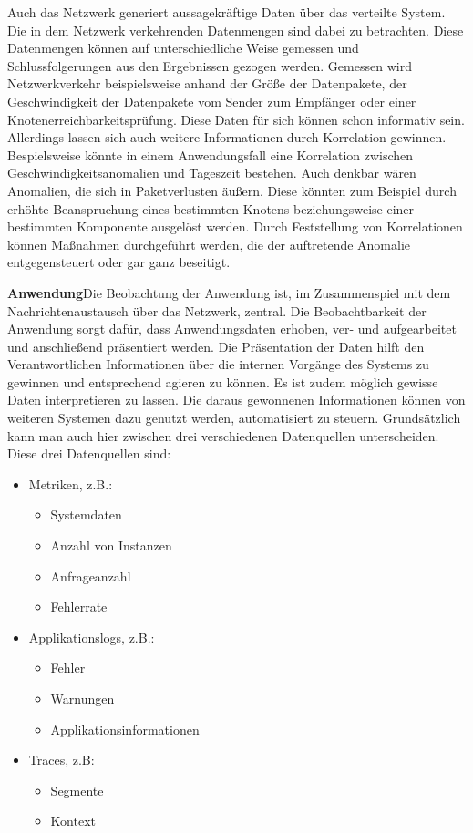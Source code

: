	Auch das Netzwerk generiert aussagekräftige Daten über das verteilte System. Die in dem Netzwerk verkehrenden Datenmengen sind dabei zu betrachten. Diese Datenmengen können auf unterschiedliche Weise gemessen und Schlussfolgerungen aus den Ergebnissen gezogen werden. Gemessen wird Netzwerkverkehr beispielsweise anhand der Größe der Datenpakete, der Geschwindigkeit der Datenpakete vom Sender zum Empfänger oder einer Knotenerreichbarkeitsprüfung. Diese Daten für sich können schon informativ sein. Allerdings lassen sich auch weitere Informationen durch Korrelation gewinnen. Bespielsweise könnte in einem Anwendungsfall eine Korrelation zwischen Geschwindigkeitsanomalien und Tageszeit bestehen. Auch denkbar wären Anomalien, die sich in Paketverlusten äußern. Diese könnten zum Beispiel durch erhöhte Beanspruchung eines bestimmten Knotens beziehungsweise einer bestimmten Komponente ausgelöst werden. Durch Feststellung von Korrelationen können Maßnahmen durchgeführt werden, die der auftretende Anomalie entgegensteuert oder gar ganz beseitigt.
	
	\textbf{Anwendung}\space\space\space Die Beobachtung der Anwendung ist, im Zusammenspiel mit dem Nachrichtenaustausch über das Netzwerk, zentral. Die Beobachtbarkeit der Anwendung sorgt dafür, dass Anwendungsdaten erhoben, ver- und aufgearbeitet und anschließend präsentiert werden. Die Präsentation der Daten hilft den Verantwortlichen Informationen über die internen Vorgänge des Systems zu gewinnen und entsprechend agieren zu können. Es ist zudem möglich gewisse Daten interpretieren zu lassen. Die daraus gewonnenen Informationen können von weiteren Systemen dazu genutzt werden, automatisiert zu steuern. Grundsätzlich kann man auch hier zwischen drei verschiedenen Datenquellen unterscheiden. Diese drei Datenquellen sind:
	
	\begin{itemize}
		\item Metriken, z.B.:
		\begin{itemize}
			\item Systemdaten
			\item Anzahl von Instanzen
			\item Anfrageanzahl
			\item Fehlerrate
		\end{itemize}
		\item Applikationslogs, z.B.:
		\begin{itemize}
			\item Fehler
			\item Warnungen
			\item Applikationsinformationen
		\end{itemize}
		\item Traces, z.B:
		\begin{itemize}
			\item Segmente
			\item Kontext
		\end{itemize}
	\end{itemize}


